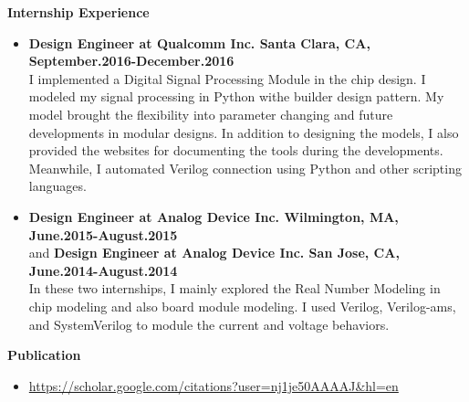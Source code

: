 \documentclass[]{article}
\begin{document}
\noindent \textbf{Internship Experience}
    \begin{itemize}
		\item \textbf{Design Engineer at Qualcomm Inc. Santa Clara, CA, September.2016-December.2016}\\
I implemented a Digital Signal Processing Module in the chip design. I modeled my signal processing
in Python withe builder design pattern. My model brought the flexibility into parameter changing and 
future developments in modular designs. In addition to designing the models, I also provided the websites for documenting the
tools during the developments. Meanwhile, I automated Verilog connection using Python 
and other scripting languages.
        \item \textbf{Design Engineer at Analog Device Inc. Wilmington, MA, June.2015-August.2015}\\
        and \textbf{Design Engineer at Analog Device Inc. San Jose, CA, June.2014-August.2014}\\
In these two internships, I mainly explored the Real Number Modeling in chip modeling and also board 
module modeling. I used Verilog, Verilog-ams, and SystemVerilog to module the current and voltage 
behaviors. 
    \end{itemize}

% 
\noindent \textbf{Publication}
\begin{itemize}
\item\url{https://scholar.google.com/citations?user=nj1je50AAAAJ&hl=en}
\end{itemize}
%     
% 
% 
% 
% 
\end{document}
